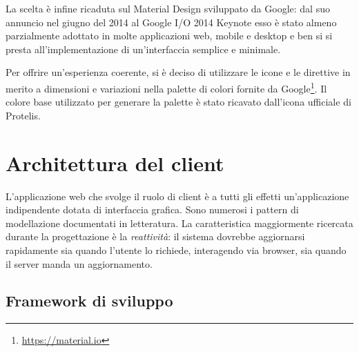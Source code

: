       La scelta è infine ricaduta sul Material Design sviluppato da Google:
      dal suo annuncio nel giugno del 2014 al Google I/O 2014 Keynote esso è stato almeno parzialmente adottato in molte applicazioni web, mobile e desktop
      e ben si si presta all'implementazione di un'interfaccia semplice e minimale. %

      Per offrire un'esperienza coerente, si è deciso di utilizzare le icone e le direttive in merito a dimensioni e variazioni nella palette di colori fornite da Google\footnote{\url{https://material.io}}.
      Il colore base utilizzato per generare la palette è stato ricavato dall'icona ufficiale di Protelis. %

  \section{Architettura del client}\label{sec:arch:client}

    L'applicazione web che svolge il ruolo di client è a tutti gli effetti un'applicazione indipendente dotata di interfaccia grafica.
    Sono numerosi i pattern di modellazione documentati in letteratura.
    La caratteristica maggiormente ricercata durante la progettazione è la \emph{reattività}:
    il sistema dovrebbe aggiornarsi rapidamente sia quando l'utente lo richiede, interagendo via browser, sia quando il server manda un aggiornamento.



    \subsection{Framework di sviluppo}\label{subsec:react}


